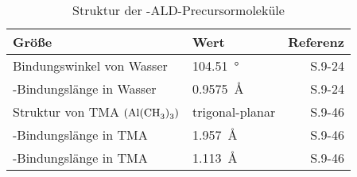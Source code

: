 \begin{table}[H]
  \centering
  \caption{Struktur der -ALD-Precursormoleküle}
  \evenrowcolors
  \begin{tabularx}{\textwidth}{|XXR|}
    \hline
    \textbf{Größe}                                & \textbf{Wert}          & \textbf{Referenz}             \\
    \hline
    Bindungswinkel von Wasser                     & \SI{104.51}{\degree}   & \cite{haynes_crc_2011} S.9-24 \\
    -Bindungslänge in Wasser              & \SI{0.9575}{\angstrom} & \cite{haynes_crc_2011} S.9-24 \\
    Struktur von TMA $\left(\ce{Al(CH3)3}\right)$ & trigonal-planar        & \cite{haynes_crc_2011} S.9-46 \\
    -Bindungslänge in TMA                & \SI{1.957}{\angstrom}  & \cite{haynes_crc_2011} S.9-46 \\
    -Bindungslänge in TMA                 & \SI{1.113}{\angstrom}  & \cite{haynes_crc_2011} S.9-46 \\
    \hline
  \end{tabularx}

\end{table}
